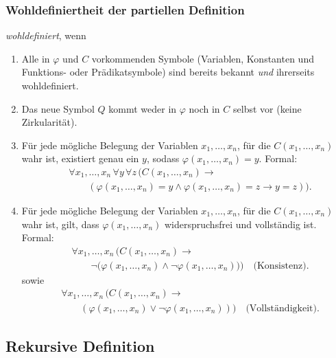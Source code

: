 \documentclass[main.tex]{subfiles}
\begin{document}
\begin{definition}
\subsubsection{Wohldefiniertheit der partiellen Definition} \emph{wohldefiniert}, wenn
\begin{enumerate}
    \item Alle in \(\varphi\) und \(C\) vorkommenden Symbole (Variablen, Konstanten und Funktions- oder Prädikatsymbole) sind bereits bekannt \emph{und} ihrerseits wohldefiniert.
    \item Das neue Symbol \(Q\) kommt weder in \(\varphi\) noch in \(C\) selbst vor (keine Zirkularität).
    \item Für jede mögliche Belegung der Variablen \(x_1,\dots,x_n\), für die \(C(x_1,\dots,x_n)\) wahr ist, existiert genau ein \(y\), sodass \(\varphi(x_1,\dots,x_n) = y\). Formal:
    \[
    \begin{aligned}
    & \forall x_1,\dots,x_n \, \forall y \, \forall z \, 
       \bigl( C(x_1,\dots,x_n) \rightarrow \\
    &\qquad (\varphi(x_1,\dots,x_n) = y \land 
              \varphi(x_1,\dots,x_n) = z \rightarrow y = z ) \bigr).
    \end{aligned}
    \]
    \item Für jede mögliche Belegung der Variablen \(x_1, \dots, x_n\), für die \(C(x_1,\dots,x_n)\) wahr ist, gilt, dass \(\varphi(x_1,\dots,x_n)\) widerspruchsfrei und vollständig ist. Formal:
    \[
    \begin{aligned}
    & \forall x_1,\dots,x_n \, 
       \bigl( C(x_1,\dots,x_n) \rightarrow \\
    &\qquad \neg\bigl( \varphi(x_1,\dots,x_n) \land 
                       \neg \varphi(x_1,\dots,x_n) \bigr) \bigr)
       \quad \text{(Konsistenz)}.
    \end{aligned}
    \]
    sowie
    \[
    \begin{aligned}
    & \forall x_1,\dots,x_n \, 
       \bigl( C(x_1,\dots,x_n) \rightarrow \\
    &\qquad ( \varphi(x_1,\dots,x_n) \lor 
               \neg \varphi(x_1,\dots,x_n) ) \bigr)
       \quad \text{(Vollständigkeit)}.
    \end{aligned}
    \]
\end{enumerate}
\end{definition}

\subsection{Rekursive Definition}
\end{document}
